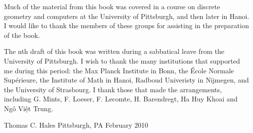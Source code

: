 Much of the material from this book was covered
in a course on discrete geometry and computers at the University of
Pittsburgh, and then later %
in Hanoi.  I would like to thank the members of these
groups for assisting in the preparation of the book.

The nth draft of this book was written during a sabbatical leave from the
University of Pittsburgh.  I wish to thank the many institutions that
supported me during this period: the Max Planck Institute in Bonn, the
\'Ecole Normale Sup\'erieure, the Institute of Math in Hanoi, Radboud
Univeristy in Nijmegen, and the University of Strasbourg.  I thank
those that made the arrangements, including G. Mints, F. Loeser,
F. Lecomte, H. Barendregt, Ha Huy Khoai and Ng\^o Vi\d{\^e}t Trung.



\bigskip
\hbox{}



\bigskip
\hbox{}

{
\parindent=0pt
\obeylines

Thomas C. Hales
Pittsburgh, PA
February 2010

}







